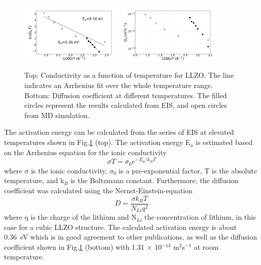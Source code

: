 \documentclass[twoside,twocolumn,9pt]{article}
\begin{document}
\begin{figure}[t]
\centering
\includegraphics[width=0.45\textwidth]{Pics/arrhenius-plot.pdf}
\includegraphics[width=0.45\textwidth]{Pics/DiffusionCoefficient.pdf}
\caption{Top: Conductivity as a function of temperature for LLZO. The line indicates an Arrhenius fit over the whole temperature range. Bottom: Diffusion coefficient at different temperatures.
	The filled circles represent the results calculated from EIS, and open circles from MD simulation.}
\label{fig:arrhenius-plot}
\end{figure}


The activation energy can be calculated from the series of EIS at elevated temperatures shown in Fig.\ref{fig:arrhenius-plot} (top).
The activation energy E$_a$ is estimated based on the Arrhenius equation for the ionic conductivity
\begin{equation}
\sigma T = \sigma_0 e^{-E_a/k_B T}
\label{eq:Arrhenius-equation}
\end{equation}
where $\sigma$ is the ionic conductivity, $\sigma_0$ is a pre-exponential factor, T is the absolute temperature, and k$_B$ is the Boltzmann constant.
Furthermore, the diffusion coefficient was calculated using the Nernst-Einstein-equation
\begin{equation}
D=\frac{\sigma k_B T}{N_{Li} q^2}
\label{eq:Nernst-Einstein-equation}
\end{equation}
where q is the charge of the lithium and N$_{Li}$ the concentration of lithium, in this case for a cubic LLZO structure.
The calculated activation energy is about 0.36~eV which is in good agreement to other publications,
as well as the diffusion coefficient shown in Fig.\ref{fig:arrhenius-plot} (bottom) with 1.31 $\times$ 10$^{-13}$ m$^2$s$^{-1}$ at room temperature.
\end{document}
